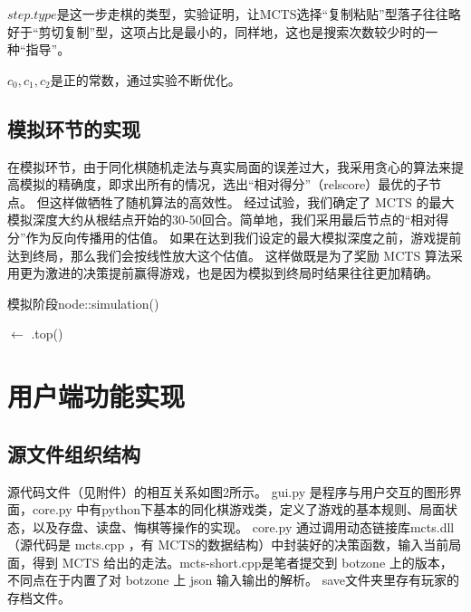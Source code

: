 \documentclass[12pt]{ctexart}
\begin{document}
	$step.type$是这一步走棋的类型，实验证明，让MCTS选择“复制粘贴”型落子往往略好于“剪切复制”型，这项占比是最小的，同样地，这也是搜索次数较少时的一种“指导”。

	$c_0,c_1,c_2$是正的常数，通过实验不断优化。

	\subsection{模拟环节的实现}
	在模拟环节，由于同化棋随机走法与真实局面的误差过大，我采用贪心的算法来提高模拟的精确度，即求出所有的情况，选出“相对得分”（\textsf{relscore}）最优的子节点。
	但这样做牺牲了随机算法的高效性。
	经过试验，我们确定了 MCTS 的最大模拟深度大约从根结点开始的30-50回合。简单地，我们采用最后节点的“相对得分”作为反向传播用的估值。
	如果在达到我们设定的最大模拟深度之前，游戏提前达到终局，那么我们会按线性放大这个估值。
	这样做既是为了奖励 MCTS 算法采用更为激进的决策提前赢得游戏，也是因为模拟到终局时结果往往更加精确。

	\begin{algorithm}
		\caption{模拟阶段node::simulation()}
		\ch $\gets$ \cq .top()\;
		
	\end{algorithm}
	

	\section{用户端功能实现}
	\subsection{源文件组织结构}
	源代码文件（见附件）的相互关系如图2所示。 \textsf{gui.py} 是程序与用户交互的图形界面，\textsf{core.py} 中有python下基本的同化棋游戏类，定义了游戏的基本规则、局面状态，以及存盘、读盘、悔棋等操作的实现。
	\textsf{core.py} 通过调用动态链接库\textsf{mcts.dll}（源代码是 \textsf{mcts.cpp} ，有 MCTS的数据结构）中封装好的决策函数，输入当前局面，得到 MCTS 给出的走法。\textsf{mcts-short.cpp}是笔者提交到 botzone 上的版本，不同点在于内置了对 botzone 上 json 输入输出的解析。
	save文件夹里存有玩家的存档文件。
\end{document}
